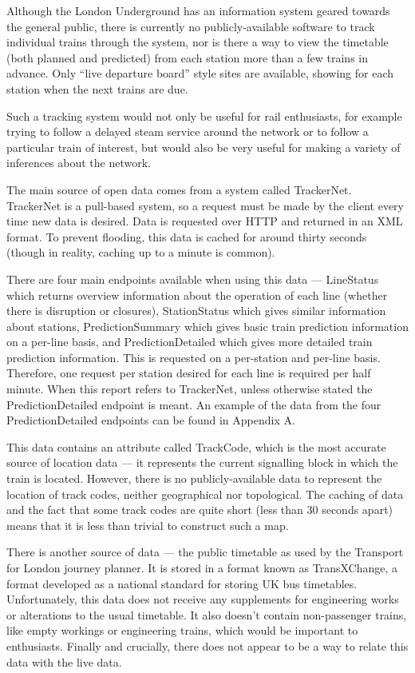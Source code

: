 \documentclass[a4paper,12pt,twoside]{report}
\begin{document}
Although the London Underground has an information system geared towards the
general public, there is currently no publicly-available software to track
individual trains through the system, nor is there a way to view the timetable
(both planned and predicted) from each station more than a few trains in
advance. Only ``live departure board'' style sites are available, showing for
each station when the next trains are due.

Such a tracking system would not only be useful for rail enthusiasts, for
example trying to follow a delayed steam service around the network or to
follow a particular train of interest, but would also be very useful for making
a variety of inferences about the network.

The main source of open data comes from a system called TrackerNet. TrackerNet
is a pull-based system, so a request must be made by the client every time new
data is desired. Data is requested over HTTP and returned in an XML format. To
prevent flooding, this data is cached for around thirty seconds (though in
reality, caching up to a minute is common).

There are four main endpoints available when using this data --- LineStatus
which returns overview information about the operation of each line (whether
there is disruption or closures), StationStatus which gives similar information
about stations, PredictionSummary which gives basic train prediction
information on a per-line basis, and PredictionDetailed which gives more
detailed train prediction information. This is requested on a per-station and
per-line basis\cite{TrackerNetSpec}. Therefore, one request per station desired
for each line is required per half minute. When this report refers to
TrackerNet, unless otherwise stated the PredictionDetailed endpoint is meant.
An example of the data from the four PredictionDetailed endpoints can be found
in Appendix A.

This data contains an attribute called TrackCode, which is the most accurate
source of location data --- it represents the current signalling block in which
the train is located. However, there is no publicly-available data to represent
the location of track codes, neither geographical nor topological. The caching
of data and the fact that some track codes are quite short (less than 30
seconds apart) means that it is less than trivial to construct such a map.

There is another source of data --- the public timetable as used by the
Transport for London journey planner. It is stored in a format known as
TransXChange, a format developed as a national standard for storing UK bus
timetables\cite{TransXChangeSpec}. Unfortunately, this data does not receive
any supplements for engineering works or alterations to the usual timetable. It
also doesn't contain non-passenger trains, like empty workings or engineering
trains, which would be important to enthusiasts. Finally and crucially, there
does not appear to be a way to relate this data with the live data.
\end{document}
